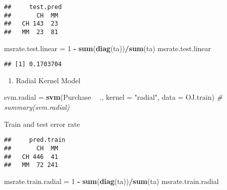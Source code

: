 \documentclass[]{article}
\newenvironment{Shaded}{\begin{snugshade}}{\end{snugshade}}
\newcommand{\CommentTok}[1]{\textcolor[rgb]{0.56,0.35,0.01}{\textit{#1}}}
\newcommand{\DataTypeTok}[1]{\textcolor[rgb]{0.13,0.29,0.53}{#1}}
\newcommand{\DecValTok}[1]{\textcolor[rgb]{0.00,0.00,0.81}{#1}}
\newcommand{\KeywordTok}[1]{\textcolor[rgb]{0.13,0.29,0.53}{\textbf{#1}}}
\newcommand{\NormalTok}[1]{#1}
\newcommand{\OperatorTok}[1]{\textcolor[rgb]{0.81,0.36,0.00}{\textbf{#1}}}
\newcommand{\StringTok}[1]{\textcolor[rgb]{0.31,0.60,0.02}{#1}}
\providecommand{\tightlist}{%
  \setlength{\itemsep}{0pt}\setlength{\parskip}{0pt}}
\begin{document}
\begin{verbatim}
##     test.pred
##       CH  MM
##   CH 143  23
##   MM  23  81
\end{verbatim}

\begin{Shaded}
\begin{Highlighting}[]
\NormalTok{msrate.test.linear =}\StringTok{ }\DecValTok{1} \OperatorTok{-}\StringTok{ }\KeywordTok{sum}\NormalTok{(}\KeywordTok{diag}\NormalTok{(ta))}\OperatorTok{/}\KeywordTok{sum}\NormalTok{(ta)}
\NormalTok{msrate.test.linear}
\end{Highlighting}
\end{Shaded}

\begin{verbatim}
## [1] 0.1703704
\end{verbatim}

\begin{enumerate}
\def\labelenumi{(\alph{enumi})}
\setcounter{enumi}{5}
\tightlist
\item
  Radial Kernel Model
\end{enumerate}

\begin{Shaded}
\begin{Highlighting}[]
\NormalTok{svm.radial =}\StringTok{ }\KeywordTok{svm}\NormalTok{(Purchase }\OperatorTok{~}\StringTok{ }\NormalTok{., }\DataTypeTok{kernel =} \StringTok{"radial"}\NormalTok{, }\DataTypeTok{data =}\NormalTok{ OJ.train)}
\CommentTok{# summary(svm.radial)}
\end{Highlighting}
\end{Shaded}

Train and test error rate

\begin{Shaded}
\end{Shaded}

\begin{verbatim}
##     pred.train
##       CH  MM
##   CH 446  41
##   MM  72 241
\end{verbatim}

\begin{Shaded}
\begin{Highlighting}[]
\NormalTok{msrate.train.radial =}\StringTok{ }\DecValTok{1} \OperatorTok{-}\StringTok{ }\KeywordTok{sum}\NormalTok{(}\KeywordTok{diag}\NormalTok{(ta))}\OperatorTok{/}\KeywordTok{sum}\NormalTok{(ta)}
\NormalTok{msrate.train.radial}
\end{Highlighting}
\end{Shaded}
\end{document}
